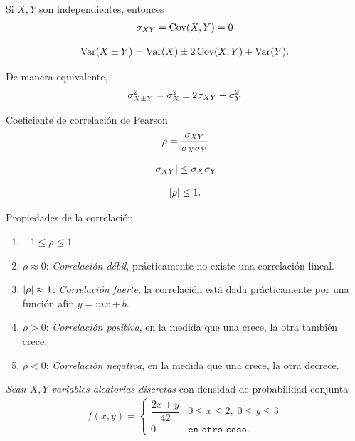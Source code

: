  Si $X,Y$ son independientes, entonces
 \begin{align}
  \label{eq:2.9.24a}
  \sigma_{XY}=\operatorname{Cov}(X,Y)=0
 \end{align}



 \begin{align}
  \label{eq:2.9.25}
  \operatorname{Var}(X\pm Y)=\operatorname{Var}(X)\pm2\operatorname{Cov}(X,Y)+\operatorname{Var}(Y).
 \end{align}




 De manera equivalente,
 \begin{align}
  \label{eq:2.9.26}
  \sigma_{X\pm Y}^{2}=\sigma_{X}^{2} \pm 2\sigma_{XY} +\sigma_{Y}^{2}
 \end{align}


{Coeficiente de correlación de Pearson}
 \begin{align}
  \label{eq:2.9.27}
  \rho = \dfrac{\sigma_{XY}}{\sigma_{X}\sigma_{Y}}
 \end{align}



 \begin{teorema}
  \begin{align}
   \label{eq:2.9.28}
   \left|\sigma_{XY}\right|\leq \sigma_{X}\sigma_{Y}
  \end{align}


 \begin{align}
  \left|\rho\right|\leq 1.
 \end{align}
 \end{teorema}


{Propiedades de la correlación}

\begin{enumerate}
\item $-1 \leq \rho \leq 1$ 
 \item $\rho \approx 0$: \emph{Correlación débil}, prácticamente no existe una correlación lineal. 
 \item $\left|\rho\right| \approx 1$:\emph{ Correlación fuerte}, la correlación está dada prácticamente por una función afín $y=mx+b$. 
 \item $\rho > 0$: \emph{Correlación positiva}, en la medida que una crece, la otra también crece. 
 \item $\rho < 0$: \emph{Correlación negativa}, en la medida que una crece, la otra decrece.
\end{enumerate}



 \begin{ejemplo}
  \label{exmp:2.9.5}
  \emph{Sean $X,Y$ variables aleatorias discretas} con densidad de probabilidad conjunta
  \begin{align}f(x,y)=
   \begin{cases}
    \dfrac{2x+y}{42} & 0\leq x \leq 2,\; 0\leq y \leq 3 \\
    0 & \texttt{en otro caso}.
   \end{cases}
  \end{align}
 \end{ejemplo}
 

